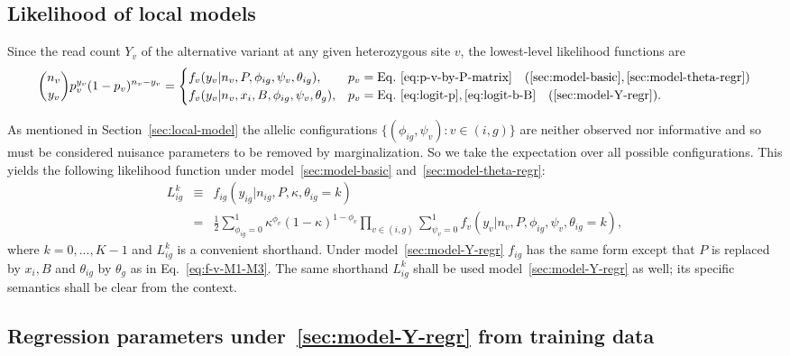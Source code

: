 \documentclass[letterpaper]{article}
\begin{document}
\subsection{Likelihood of local models}
\label{sec:likelihood-local}

Since the read count \(Y_v\) of the alternative variant at any given
heterozygous site \(v\), the lowest-level likelihood functions are
\begin{equation}
\label{eq:f-v-M1-M3}
\binom{n_v}{y_v} p_v^{y_v} (1-p_v)^{n_v-y_v}
=
\begin{cases}
f_v(y_v | n_v, P, \phi_{ig}, \psi_v, \theta_{ig}), & p_v =
\mathrm{Eq.~}\ref{eq:p-v-by-P-matrix}
\quad (\ref{sec:model-basic}, \ref{sec:model-theta-regr}) \\
f_v(y_v | n_v, x_i, B, \phi_{ig}, \psi_v, \theta_{g}), & p_v =
\mathrm{Eq.~}\ref{eq:logit-p},\ref{eq:logit-b-B}
\quad (\ref{sec:model-Y-regr}).
\end{cases}
\end{equation}

As mentioned in Section~\ref{sec:local-model} the allelic configurations \( \{
(\phi_{ig},\psi_v) : v\in(i,g) \} \) are neither observed nor informative and
so must be considered nuisance parameters to be removed by marginalization.
So we take the expectation over all possible configurations.  This yields the
following likelihood function under model~\ref{sec:model-basic}
and~\ref{sec:model-theta-regr}:
\begin{eqnarray}
\label{eq:f-ig}
L_{ig}^k &\equiv&
f_{ig}(y_{ig} | n_{ig}, P, \kappa, \theta_{ig}=k)
\\
\label{eq:f-ig-continued}
&=&
\frac{1}{2}
\sum_{\phi_{ig}=0}^1 \kappa^{\phi_v} (1 - \kappa)^{1-\phi_v}
\prod_{v\in(i,g)}
\sum_{\psi_v=0}^1
f_v(y_v | n_v, P, \phi_{ig}, \psi_v, \theta_{ig}=k),
\end{eqnarray}
where \(k=0,...,K-1\) and \(L_{ig}^k\) is a convenient shorthand.  Under
model~\ref{sec:model-Y-regr} \(f_{ig}\) has the same form except that \(P\) is
replaced by \(x_i,B\) and \(\theta_{ig}\) by \(\theta_g\) as in
Eq.~\ref{eq:f-v-M1-M3}.  The same shorthand \(L_{ig}^k\) shall
be used model~\ref{sec:model-Y-regr} as well; its specific semantics shall be clear from
the context.

\subsection{Regression parameters under~\ref{sec:model-Y-regr} from training data}
\label{sec:beta-from-training-data}
\end{document}

